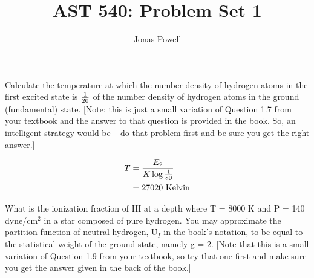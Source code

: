 \documentclass[12pt]{article}
\newenvironment{problem}[2][Problem]{\begin{trivlist}
\item[\hskip \labelsep {\bfseries #1}\hskip \labelsep {\bfseries #2.}]}{\end{trivlist}}
\newenvironment{answer}[2][Answer]{\begin{trivlist}
\item[\hskip \labelsep {\bfseries #1}\hskip \labelsep {\bfseries #2.}]}{\end{trivlist}}
\begin{document}

\title{AST 540: Problem Set 1}
\author{Jonas Powell}
\maketitle

\begin{problem}{1}

\end{problem}

\begin{answer}{1}


\end{answer}

\bigskip
\bigskip

\begin{problem}{2}
Calculate the temperature at which the number density of hydrogen atoms in the first excited state is $1 \over 20$ of the number density of hydrogen atoms in the ground (fundamental) state. [Note: this is just a small variation of Question 1.7 from your textbook and the answer to that question is provided in the book. So, an intelligent strategy would be -- do that problem first and be sure you get the right answer.]
\end{problem}

\begin{answer}{2}

\begin{align}
  T &= \frac{E_2}{K \log{\frac{1}{80}}}  \notag \\
    &= 27020 \text{ Kelvin}
\end{align}

\end{answer}
\bigskip
\bigskip

\begin{problem}{3}
What is the ionization fraction of HI at a depth where T = 8000 K and P = 140 dyne/cm$^2$ in a star composed of pure hydrogen. You may approximate the partition function of neutral hydrogen, U$_I$ in the book's notation, to be equal to the statistical weight of the ground state, namely g = 2. [Note that this is a small variation of Question 1.9 from your textbook, so try that one first and make sure you get the answer given in the back of the book.]
\end{problem}
\end{document}
